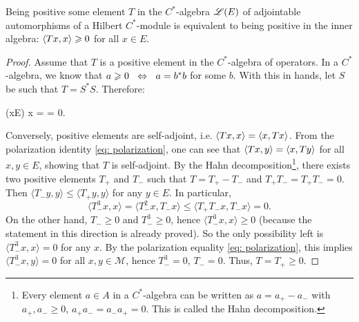 \begin{proposicao}
    Being positive some element $T$ in the $C^*$-algebra $\mathscr L(E)$ of adjointable automorphisms of a Hilbert $C^*$-module is equivalent to being positive in the inner algebra: $\langle {Tx},{x}\rangle \geqslant 0$ for all $x\in E$.
    \begin{proof}
    Assume that $T$ is a positive element in the $C^*$-algebra of operators. In a $C^*$-algebra, we know that $a \geqslant 0 \operatorname{\hspace{0.25cm}\Leftrightarrow\hspace{0.25cm}} a=b^*b$ for some $b$. With this in hands, let $S$ be such that $T = S^*S$. Therefore:
    \begin{eqspaced}{(x\in E)}
    x =  =  \bilateral{-0.25cm}{\overset{\ref{def: pre-hilb module}\ref{def item: positivo definido}}\geq} 0.
    \end{eqspaced}
    Conversely, positive elements are self-adjoint, i.e. $\langle {Tx},{x}\rangle = \langle {x},{Tx}\rangle$. From the polarization identity \ref{eq: polarization}, one can see that $\langle {Tx},{y}\rangle = \langle {x},{Ty}\rangle$ for all $x,y \in E$, showing that $T$ is self-adjoint. By the Hahn decomposition\footnote{Every element $a\in A$ in a $C^*$-algebra can be written as $a = a_+-a_-$ with $a_+, a_-\geqslant 0$, $a_+a_-=a_-a_+=0$. This is called the Hahn decomposition.}, there exists two positive elements $T_+$ and $T_-$ such that $T = T_+-T_-$ and $T_+T_-= T_+T_- = 0$. Then $\langle T_{-} y, y\rangle \leq\langle T_{+} y, y\rangle$ for any $y \in E$. In particular,
    $$
    \langle T_{-}^{3} x, x\rangle=\langle T_{-}^{2} x, T_{-} x\rangle \leq\langle T_{+} T_{-} x, T_{-} x\rangle=0 .
    $$
    On the other hand, $T_{-} \geq 0$ and $T_{-}^{3} \geq 0$, hence $\langle T_{-}^{3} x, x\rangle \geq 0$ (because the statement in this direction is already proved). So the only possibility left is $\langle T_{-}^{3} x, x\rangle=0$ for any $x $. By the polarization equality \ref{eq: polarization}, this implies $\langle T_{-}^{3} x, y\rangle=0$ for all $x, y \in \mathcal{M}$, hence $T_{-}^{3}=0$, $T_{-}=0$. Thus, $T=T_{+} \geq 0$.
    \end{proof}
\end{proposicao}
    
